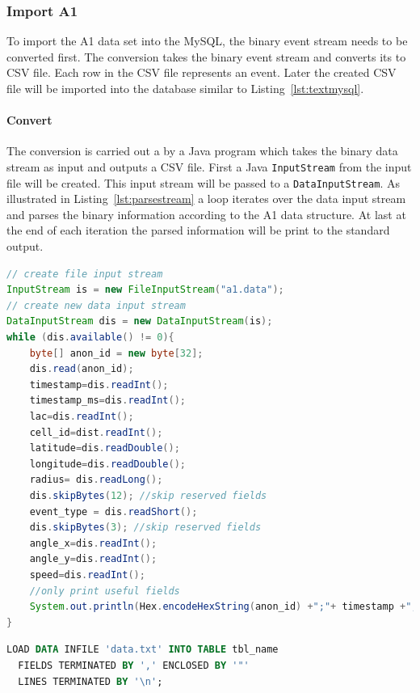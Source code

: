 \documentclass[master,english]{hgbthesis}
\begin{document}
\subsubsection{Import A1}
To import the A1 data set into the MySQL, the binary event stream needs to be converted first. The conversion takes the binary event stream and converts its to CSV file. Each row in the CSV file represents an event. Later the created CSV file will be imported into the database similar to Listing~\ref{lst:textmysql}.
\paragraph{Convert}
The conversion is carried out a by a Java program which takes the binary data stream as input and outputs a CSV file. First a Java \verb|InputStream| from the input file will be created. This input stream will be passed to a \verb|DataInputStream|. As illustrated in Listing~\ref{lst:parsestream} a loop iterates over the data input stream and parses the binary information according to the A1 data structure. At last at the end of each iteration the parsed information will be print to the standard output.
\begin{lstlisting}[language=Java,style=JAVA,caption={Example code to parse event data stream},label={lst:parsestream}]
// create file input stream
InputStream is = new FileInputStream("a1.data");
// create new data input stream
DataInputStream dis = new DataInputStream(is);
while (dis.available() != 0){
    byte[] anon_id = new byte[32];
    dis.read(anon_id);
    timestamp=dis.readInt();
    timestamp_ms=dis.readInt();
    lac=dis.readInt();
    cell_id=dist.readInt();
    latitude=dis.readDouble();
    longitude=dis.readDouble();
    radius= dis.readLong();
    dis.skipBytes(12); //skip reserved fields
    event_type = dis.readShort();
    dis.skipBytes(3); //skip reserved fields
    angle_x=dis.readInt();
    angle_y=dis.readInt();
    speed=dis.readInt();
    //only print useful fields
    System.out.println(Hex.encodeHexString(anon_id) +";"+ timestamp +";"+lac +";"+cell_id +";"+latitude +";"+longitude +";"+event_type +";"+angle_x);
}
\end{lstlisting}
\begin{lstlisting}[style=htmlcssjs,language=SQL,caption={Load text file into MySQL database},label={lst:textmysql}]
LOAD DATA INFILE 'data.txt' INTO TABLE tbl_name
  FIELDS TERMINATED BY ',' ENCLOSED BY '"'
  LINES TERMINATED BY '\n';
\end{lstlisting}
\end{document}

